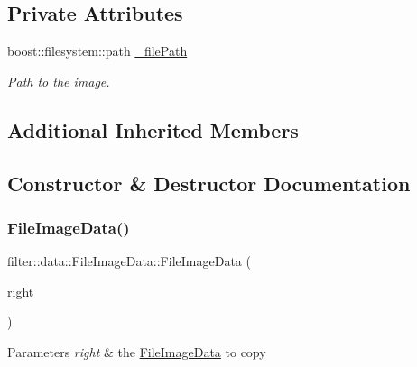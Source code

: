 \subsection*{Private Attributes}
\begin{DoxyCompactItemize}
\item 
\mbox{\label{classfilter_1_1data_1_1_file_image_data_ac40a6678009c5f0745adc81ff32ea2ef}} 
boost\+::filesystem\+::path \hyperlink{classfilter_1_1data_1_1_file_image_data_ac40a6678009c5f0745adc81ff32ea2ef}{\+\_\+file\+Path}
\begin{DoxyCompactList}\small\item\em Path to the image. \end{DoxyCompactList}\end{DoxyCompactItemize}
\subsection*{Additional Inherited Members}


\subsection{Constructor \& Destructor Documentation}
\mbox{\label{classfilter_1_1data_1_1_file_image_data_aa49f9012959f0f8f8c1826be3a31fdf6}} 
\subsubsection{\texorpdfstring{File\+Image\+Data()}{FileImageData()}\hspace{0.1cm}{\footnotesize\ttfamily [1/2]}}
{\footnotesize\ttfamily filter\+::data\+::\+File\+Image\+Data\+::\+File\+Image\+Data (\begin{DoxyParamCaption}\item[{const \hyperlink{classfilter_1_1data_1_1_file_image_data}{File\+Image\+Data} \&}]{right }\end{DoxyParamCaption})\hspace{0.3cm}{\ttfamily [inline]}}


\begin{DoxyParams}{Parameters}
{\em right} & the \hyperlink{classfilter_1_1data_1_1_file_image_data}{File\+Image\+Data} to copy \\
\hline
\end{DoxyParams}
\mbox{\label{classfilter_1_1data_1_1_file_image_data_ad5fb185db36ade62bc5eb46d30b938a1}} 
